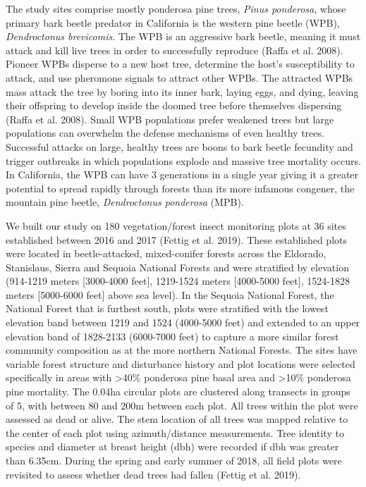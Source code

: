 \documentclass[]{article}
\begin{document}
The study sites comprise mostly ponderosa pine trees, \emph{Pinus
ponderosa}, whose primary bark beetle predator in California is the
western pine beetle (WPB), \emph{Dendroctonus brevicomis}. The WPB is an
aggressive bark beetle, meaning it must attack and kill live trees in
order to successfully reproduce (Raffa et al. 2008). Pioneer WPBs
disperse to a new host tree, determine the host's susceptibility to
attack, and use pheromone signals to attract other WPBs. The attracted
WPBs mass attack the tree by boring into its inner bark, laying eggs,
and dying, leaving their offspring to develop inside the doomed tree
before themselves dispersing (Raffa et al. 2008). Small WPB populations
prefer weakened trees but large populations can overwhelm the defense
mechanisms of even healthy trees. Successful attacks on large, healthy
trees are boons to bark beetle fecundity and trigger outbreaks in which
populations explode and massive tree mortality occurs. In California,
the WPB can have 3 generations in a single year giving it a greater
potential to spread rapidly through forests than its more infamous
congener, the mountain pine beetle, \emph{Dendroctonus ponderosa} (MPB).

We built our study on 180 vegetation/forest insect monitoring plots at
36 sites established between 2016 and 2017 (Fettig et al. 2019). These
established plots were located in beetle-attacked, mixed-conifer forests
across the Eldorado, Stanislaus, Sierra and Sequoia National Forests and
were stratified by elevation (914-1219 meters {[}3000-4000 feet{]},
1219-1524 meters {[}4000-5000 feet{]}, 1524-1828 meters {[}5000-6000
feet{]} above sea level). In the Sequoia National Forest, the National
Forest that is furthest south, plots were stratified with the lowest
elevation band between 1219 and 1524 (4000-5000 feet) and extended to an
upper elevation band of 1828-2133 (6000-7000 feet) to capture a more
similar forest community composition as at the more northern National
Forests. The sites have variable forest structure and disturbance
history and plot locations were selected specifically in areas with
\textgreater{}40\% ponderosa pine basal area and \textgreater{}10\%
ponderosa pine mortality. The 0.04ha circular plots are clustered along
transects in groups of 5, with between 80 and 200m between each plot.
All trees within the plot were assessed as dead or alive. The stem
location of all trees was mapped relative to the center of each plot
using azimuth/distance measurements. Tree identity to species and
diameter at breast height (dbh) were recorded if dbh was greater than
6.35cm. During the spring and early summer of 2018, all field plots were
revisited to assess whether dead trees had fallen (Fettig et al. 2019).
\end{document}
